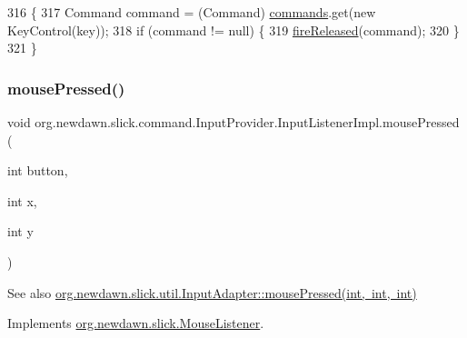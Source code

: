 \begin{DoxyCode}
316                                                  \{
317             Command command = (Command) \mbox{\hyperlink{classorg_1_1newdawn_1_1slick_1_1command_1_1_input_provider_ab2bd0c08506a59bc7457d7a87cf873d2}{commands}}.get(\textcolor{keyword}{new} KeyControl(key));
318             \textcolor{keywordflow}{if} (command != null) \{
319                 \mbox{\hyperlink{classorg_1_1newdawn_1_1slick_1_1command_1_1_input_provider_afede03e3ab95cb0248635cf64de6874c}{fireReleased}}(command);
320             \}
321         \}
\end{DoxyCode}
\mbox{\label{classorg_1_1newdawn_1_1slick_1_1command_1_1_input_provider_1_1_input_listener_impl_a7a660580dd4fbf3042c07d83d88022b7}} 
\subsubsection{\texorpdfstring{mouse\+Pressed()}{mousePressed()}}
{\footnotesize\ttfamily void org.\+newdawn.\+slick.\+command.\+Input\+Provider.\+Input\+Listener\+Impl.\+mouse\+Pressed (\begin{DoxyParamCaption}\item[{int}]{button,  }\item[{int}]{x,  }\item[{int}]{y }\end{DoxyParamCaption})\hspace{0.3cm}{\ttfamily [inline]}}

\begin{DoxySeeAlso}{See also}
\mbox{\hyperlink{classorg_1_1newdawn_1_1slick_1_1util_1_1_input_adapter_a8c466a6d0e2479d535aa5f435fcc684d}{org.\+newdawn.\+slick.\+util.\+Input\+Adapter\+::mouse\+Pressed(int, int, int)}} 
\end{DoxySeeAlso}


Implements \mbox{\hyperlink{interfaceorg_1_1newdawn_1_1slick_1_1_mouse_listener_aeca4c21a38aa31c408f3daf6f86c0925}{org.\+newdawn.\+slick.\+Mouse\+Listener}}.


